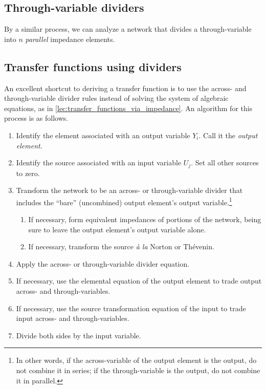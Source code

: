 \documentclass[dynamic_systems.tex]{subfiles}
\begin{document}
\subsection{Through-variable dividers}
\tags{}

By a similar process, we can analyze a network that divides a through-variable into $n$ \emph{parallel} impedance elements.

\subsection{Transfer functions using dividers}
\tags{}

An excellent shortcut to deriving a transfer function is to use the across- and through-variable divider rules instead of solving the system of algebraic equations, as in \cref{lec:transfer_functions_via_impedance}.
An algorithm for this process is as follows.
\begin{enumerate}
	\item Identify the element associated with an output variable $Y_i$.
	Call it the \emph{output element}.
	\item Identify the source associated with an input variable $U_j$.
	Set all other sources to zero.
	\item Transform the network to be an across- or through-variable divider that includes the ``bare'' (uncombined) output element's output variable.\footnote{In other words, if the across-variable of the output element is the output, do not combine it in series; if the through-variable is the output, do not combine it in parallel.}
	\begin{enumerate}
		\item If necessary, form equivalent impedances of portions of the network, being sure to leave the output element's output variable alone.
		\item If necessary, transform the source \emph{\`a la} Norton or Th\'evenin.
	\end{enumerate}
	\item Apply the across- or through-variable divider equation.
	\item If necessary, use the elemental equation of the output element to trade output across- and through-variables.
	\item If necessary, use the source transformation equation of the input to trade input across- and through-variables.
	\item Divide both sides by the input variable.
\end{enumerate}
\end{document}
